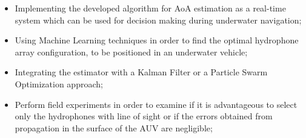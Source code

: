 \begin{itemize}
	\item Implementing the developed algorithm for AoA estimation as a real-time system which can be used for decision making during underwater navigation;
	
	\item Using Machine Learning techniques in order to find the optimal hydrophone array configuration, to be positioned in an underwater vehicle;
	
	\item Integrating the estimator with a Kalman Filter or a Particle Swarm Optimization approach;
	
	\item Perform field experiments in order to examine if it is advantageous to select only the hydrophones with line of sight or if the errors obtained from propagation in the surface of the AUV are negligible;
\end{itemize}